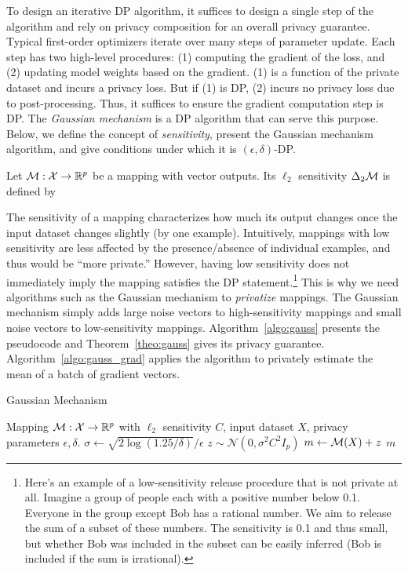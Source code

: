 To design an iterative DP algorithm, it suffices to design a single step of the algorithm and rely on privacy composition for an overall privacy guarantee.
Typical first-order optimizers iterate over many steps of parameter update.
Each step has two high-level procedures: (1) computing the gradient of the loss, and (2) updating model weights based on the gradient.
(1) is a function of the private dataset and incurs a privacy loss.
But if (1) is DP, (2) incurs no privacy loss due to post-processing.
Thus, it suffices to ensure the gradient computation step is DP.
The \emph{Gaussian mechanism} is a DP algorithm that can serve this purpose.
Below, we define the concept of \emph{sensitivity}, present the Gaussian mechanism algorithm, and give conditions under which it is $(\epsilon, \delta)$-DP.
\begin{defi}
Let $\mathcal{M}: \mathcal{X} \to \mathbb{R}^p$ be a mapping with vector outputs.
Its $\ell_2$ sensitivity $\Delta_2 \mathcal{M}$ is defined by
\end{defi}
The sensitivity of a mapping characterizes how much its output changes once the input dataset changes slightly (by one example).
Intuitively, mappings with low sensitivity are less affected by the presence/absence of individual examples, and thus would be ``more private.''
However, having low sensitivity does not immediately imply the mapping satisfies the DP statement.\footnote{Here's an example of a low-sensitivity release procedure that is not private at all. Imagine a group of people each with a positive number below 0.1. Everyone in the group except Bob has a rational number. We aim to release the sum of a subset of these numbers. The sensitivity is 0.1 and thus small, but whether Bob was included in the subset can be easily inferred (Bob is included if the sum is irrational).}
This is why we need algorithms such as the Gaussian mechanism to \emph{privatize} mappings.
The Gaussian mechanism simply adds large noise vectors to high-sensitivity mappings and small noise vectors to low-sensitivity mappings.
Algorithm~\ref{algo:gauss} presents the pseudocode and Theorem~\ref{theo:gauss} gives its privacy guarantee.
Algorithm~\ref{algo:gauss_grad} applies the algorithm to privately estimate the mean of a batch of gradient vectors.
\begin{algorithm}[H]
\centering
\caption{Gaussian Mechanism}
\begin{algorithmic}[1]
    Mapping $\mathcal{M}: \mathcal{X} \to \mathbb{R}^p$ with $\ell_2$ sensitivity $C$, input dataset $X$, privacy parameters $\epsilon, \delta$.
  \State $\sigma \gets  \sqrt{2 \log(1.25 / \delta) } / \epsilon $
  \State $z \sim \mathcal{N}(0, \sigma^2 C^2 I_p)$
  \State $m \gets \mathcal{M}(X) + z$
  \State \Return $m$
\end{algorithmic}
\label{algo:gauss}
\end{algorithm}

